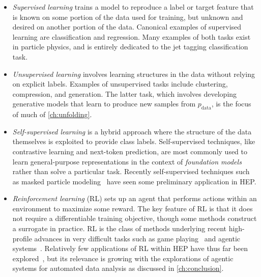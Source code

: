 \begin{itemize}
    \item \textit{Supervised learning} trains a model to reproduce a label or target feature that is known on some portion of the data used for training, but unknown and desired on another portion of the data.
    Canonical examples of supervised learning are classification and regression.
    Many examples of both tasks exist in particle physics, and  is entirely dedicated to the jet tagging classification task.
    \item \textit{Unsupervised learning} involves learning structures in the data without relying on explicit labels.
    Examples of unsupervised tasks include clustering, compression, and generation.
    The latter task, which involves developing generative models that learn to produce new samples from $p_{\text{data}}$, is the focus of much of \cref{ch:unfolding}.
    \item \textit{Self-supervised learning} is a hybrid approach where the structure of the data themselves is exploited to provide class labels.
    Self-supervised techniques, like contrastive learning and next-token prediction, are most commonly used to learn general-purpose representations in the context of 
    \textit{foundation models} rather than solve a particular task.
    Recently self-supervised techniques such as masked particle modeling~\cite{Golling:2024abg,Birk:2024knn} have seen some preliminary application in HEP.
    \item \textit{Reinforcement learning} (RL) sets up an agent that performs actions within an environment to maximize some reward.
    The key feature of RL is that it does not require a differentiable training objective, though some methods construct a surrogate in practice.
    RL is the class of methods underlying recent high-profile advances in very difficult tasks such as game playing~\cite{Silver:2016alphago} and agentic systems~\cite{Ouyang:2022instructgpt}.
    Relatively few applications of RL within HEP have thus far been explored~\cite{Baretz:2025zsv}, but its relevance is growing with the explorations of agentic systems for automated data analysis as discussed in \cref{ch:conclusion}.
\end{itemize}

